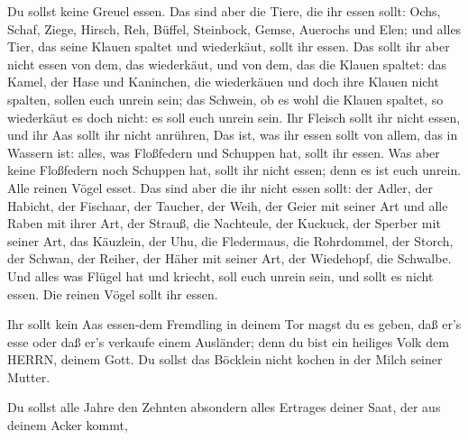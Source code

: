  Du sollst keine Greuel essen.  Das sind aber
die Tiere, die ihr essen sollt: Ochs, Schaf, Ziege,  Hirsch,
Reh, Büffel, Steinbock, Gemse, Auerochs und Elen;  und alles
Tier, das seine Klauen spaltet und wiederkäut, sollt ihr essen.
 Das sollt ihr aber nicht essen von dem, das wiederkäut, und
von dem, das die Klauen spaltet: das Kamel, der Hase und Kaninchen, die
wiederkäuen und doch ihre Klauen nicht spalten, sollen euch unrein sein;
 das Schwein, ob es wohl die Klauen spaltet, so wiederkäut
es doch nicht: es soll euch unrein sein. Ihr Fleisch sollt ihr nicht
essen, und ihr Aas sollt ihr nicht anrühren,  Das ist, was
ihr essen sollt von allem, das in Wassern ist: alles, was Floßfedern und
Schuppen hat, sollt ihr essen.  Was aber keine Floßfedern
noch Schuppen hat, sollt ihr nicht essen; denn es ist euch unrein.
 Alle reinen Vögel esset.  Das sind aber die
ihr nicht essen sollt: der Adler, der Habicht, der Fischaar,
 der Taucher, der Weih, der Geier mit seiner Art
 und alle Raben mit ihrer Art,  der Strauß,
die Nachteule, der Kuckuck, der Sperber mit seiner Art, 
das Käuzlein, der Uhu, die Fledermaus,  die Rohrdommel, der
Storch, der Schwan,  der Reiher, der Häher mit seiner Art,
der Wiedehopf, die Schwalbe.  Und alles was Flügel hat und
kriecht, soll euch unrein sein, und sollt es nicht essen. 
Die reinen Vögel sollt ihr essen.

 Ihr sollt kein Aas essen-dem Fremdling in deinem Tor magst
du es geben, daß er's esse oder daß er's verkaufe einem Ausländer; denn
du bist ein heiliges Volk dem HERRN, deinem Gott. Du sollst das Böcklein
nicht kochen in der Milch seiner Mutter.

 Du sollst alle Jahre den Zehnten absondern alles Ertrages
deiner Saat, der aus deinem Acker kommt,

